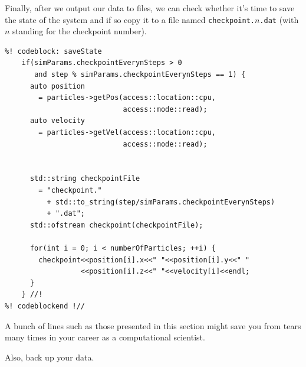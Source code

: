 Finally, after we output our data to files, we can check whether it's time to 
save the state of the system and if so copy it to a file named 
\texttt{checkpoint.}$n$\texttt{.dat} (with $n$ standing for the checkpoint 
number).
\begin{lstlisting}
%! codeblock: saveState
    if(simParams.checkpointEverynSteps > 0
       and step % simParams.checkpointEverynSteps == 1) {
      auto position
        = particles->getPos(access::location::cpu,
                            access::mode::read);
      auto velocity
        = particles->getVel(access::location::cpu,
                            access::mode::read);


      std::string checkpointFile
        = "checkpoint."
          + std::to_string(step/simParams.checkpointEverynSteps)
          + ".dat";
      std::ofstream checkpoint(checkpointFile);

      for(int i = 0; i < numberOfParticles; ++i) {
        checkpoint<<position[i].x<<" "<<position[i].y<<" "
                  <<position[i].z<<" "<<velocity[i]<<endl;
      }
    } //!
%! codeblockend !//
\end{lstlisting}

A bunch of lines such as those presented in this section might save you from 
tears many times in your career as a computational scientist.

Also, back up your data.

